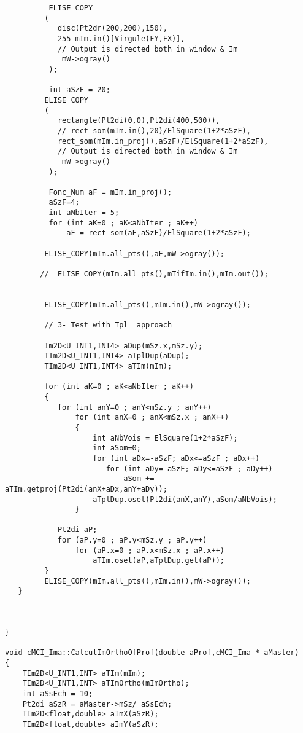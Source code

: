 \documentclass[a4paper]{book}
\begin{document}
\begin{lstlisting}
          ELISE_COPY
         (
            disc(Pt2dr(200,200),150),
            255-mIm.in()[Virgule(FY,FX)],
            // Output is directed both in window & Im
             mW->ogray()
          );

          int aSzF = 20;
         ELISE_COPY
         (
            rectangle(Pt2di(0,0),Pt2di(400,500)),
            // rect_som(mIm.in(),20)/ElSquare(1+2*aSzF),
            rect_som(mIm.in_proj(),aSzF)/ElSquare(1+2*aSzF),
            // Output is directed both in window & Im
             mW->ogray()
          );

          Fonc_Num aF = mIm.in_proj();
          aSzF=4;
          int aNbIter = 5;
          for (int aK=0 ; aK<aNbIter ; aK++)
              aF = rect_som(aF,aSzF)/ElSquare(1+2*aSzF);

         ELISE_COPY(mIm.all_pts(),aF,mW->ogray());

        //  ELISE_COPY(mIm.all_pts(),mTifIm.in(),mIm.out());


         ELISE_COPY(mIm.all_pts(),mIm.in(),mW->ogray());

         // 3- Test with Tpl  approach

         Im2D<U_INT1,INT4> aDup(mSz.x,mSz.y);
         TIm2D<U_INT1,INT4> aTplDup(aDup);
         TIm2D<U_INT1,INT4> aTIm(mIm);

         for (int aK=0 ; aK<aNbIter ; aK++)
         {
            for (int anY=0 ; anY<mSz.y ; anY++)
                for (int anX=0 ; anX<mSz.x ; anX++)
                {
                    int aNbVois = ElSquare(1+2*aSzF);
                    int aSom=0;
                    for (int aDx=-aSzF; aDx<=aSzF ; aDx++)
                       for (int aDy=-aSzF; aDy<=aSzF ; aDy++)
                           aSom += aTIm.getproj(Pt2di(anX+aDx,anY+aDy));
                    aTplDup.oset(Pt2di(anX,anY),aSom/aNbVois);
                }

            Pt2di aP;
            for (aP.y=0 ; aP.y<mSz.y ; aP.y++)
                for (aP.x=0 ; aP.x<mSz.x ; aP.x++)
                    aTIm.oset(aP,aTplDup.get(aP));
         }
         ELISE_COPY(mIm.all_pts(),mIm.in(),mW->ogray());
   }



}

void cMCI_Ima::CalculImOrthoOfProf(double aProf,cMCI_Ima * aMaster)
{
    TIm2D<U_INT1,INT> aTIm(mIm);
    TIm2D<U_INT1,INT> aTImOrtho(mImOrtho);
    int aSsEch = 10;
    Pt2di aSzR = aMaster->mSz/ aSsEch;
    TIm2D<float,double> aImX(aSzR);
    TIm2D<float,double> aImY(aSzR);


\end{lstlisting}
\end{document}
